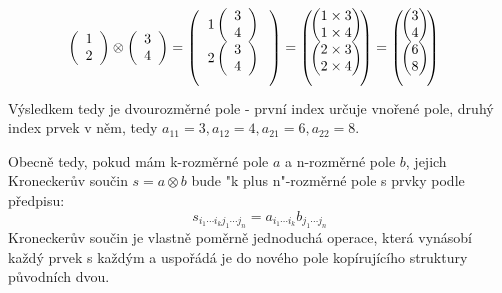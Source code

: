 \documentclass[a5paper,12pt]{amsbook}
\theoremstyle{definition}
\begin{document}
\begin{equation*}
\begin{split}
& \left(\begin{array}{c}1 \\ 2\end{array}\right)\otimes\left(\begin{array}{c}3 \\ 4\end{array}\right) =
\left(\begin{blockarray}{c}
\begin{block}{c}
1 \left(\begin{array}{c}3 \\ 4\end{array}\right) \\
2 \left(\begin{array}{c}3 \\ 4\end{array}\right) \\
\end{block}
\end{blockarray}\right) =
\left(\begin{blockarray}{c}
\begin{block}{(c)}
1 \times 3 \\
1 \times 4 \\
\end{block}
\begin{block}{(c)}
2 \times 3 \\
2 \times 4 \\
\end{block}
\end{blockarray}\right) =
\left(\begin{blockarray}{c}
\begin{block}{(c)}
3 \\
4 \\
\end{block}
\begin{block}{(c)}
6 \\
8 \\
\end{block}
\end{blockarray}\right)
\end{split}
\end{equation*}
Výsledkem tedy je dvourozměrné pole - první index určuje vnořené pole, druhý index prvek v něm, tedy
$a_{11} = 3, a_{12} = 4, a_{21} = 6, a_{22} = 8$.

Obecně tedy, pokud mám k-rozměrné pole $a$ a n-rozměrné pole $b$, jejich Kroneckerův součin 
$s = a \otimes b$ bude "k plus n"-rozměrné pole s prvky podle předpisu:
\begin{equation*}
s_{i_1 \cdots i_k j_1 \cdots j_n} = a_{i_1 \cdots i_k} b_{j_1 \cdots j_n}
\end{equation*}
Kroneckerův součin je vlastně poměrně jednoduchá operace, která vynásobí každý prvek s každým
a uspořádá je do nového pole kopírujícího struktury původních dvou.
\end{document}
